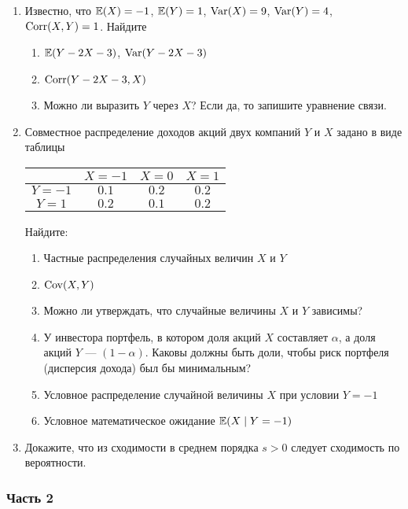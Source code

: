 \begin{enumerate}
\item Известно, что  $\mathbb{E}(X)=-1$, $\mathbb{E}(Y)=1$, $\operatorname{Var}(X)=9$, $\operatorname{Var}(Y)=4$, $\operatorname{Corr}(X,Y)=1$. Найдите
\begin{enumerate}
\item $\mathbb{E}(Y-2X-3)$, $\operatorname{Var}(Y-2X-3)$
\item  $\operatorname{Corr}(Y-2X-3,X)$
\item Можно ли выразить $Y$ через $X$? Если да, то запишите уравнение связи.
\end{enumerate}

\item Совместное распределение доходов акций двух компаний $Y$ и $X$ задано в виде таблицы

\begin{tabular}{@{}c|ccc@{}}
\toprule
    & $X=-1$ & $X=0$ & $X=1$ \\ \midrule
$Y=-1$ & $0.1$  & $0.2$   & $0.2$ \\
$Y=1$ & $0.2$  & $0.1$ & $0.2$ \\ \bottomrule
\end{tabular}

Найдите:
\begin{enumerate}
\item Частные распределения случайных величин $X$ и $Y$
\item $\operatorname{Cov}(X,Y)$
\item Можно ли утверждать, что случайные величины $X$ и $Y$ зависимы?
\item У инвестора портфель, в котором доля акций $X$ составляет $
\alpha$, а доля акций $Y$ — $(1-\alpha)$. Каковы должны быть доли, чтобы риск портфеля (дисперсия дохода) был бы минимальным?
\item Условное распределение случайной величины $X$ при условии $Y=-1$
\item Условное математическое ожидание $\mathbb{E}(X\mid Y=-1)$
\end{enumerate}

\item Докажите, что из сходимости в среднем порядка $s>0$ следует сходимость по вероятности.

\end{enumerate}


\subsubsection*{Часть 2}

